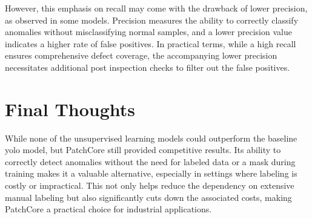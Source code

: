 However, this emphasis on recall may come with the drawback of lower precision, as observed in some models. Precision measures the ability to correctly classify anomalies without misclassifying normal samples, and a lower precision value indicates a higher rate of false positives. In practical terms, while a high recall ensures comprehensive defect coverage, the accompanying lower precision necessitates additional post inspection checks to filter out the false positives.

\section*{Final Thoughts}

While none of the unsupervised learning models could outperform the baseline \gls{yolo} model, but PatchCore still provided competitive results. Its ability to correctly detect anomalies without the need for labeled data or a mask during training makes it a valuable alternative, especially in settings where labeling is costly or impractical. This not only helps reduce the dependency on extensive manual labeling but also significantly cuts down the associated costs, making PatchCore a practical choice for industrial applications. 
